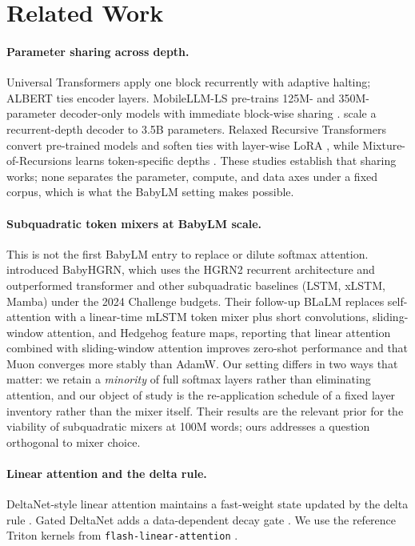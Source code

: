 \documentclass[11pt]{article}
\begin{document}
\section{Related Work}

\paragraph{Parameter sharing across depth.} Universal Transformers \citep{dehghani2019universal} apply one block recurrently with adaptive halting; ALBERT \citep{lan2020albert} ties encoder layers. MobileLLM-LS pre-trains 125M- and 350M-parameter decoder-only models with immediate block-wise sharing \citep{liu2024mobilellm}. \citet{geiping2025recurrent} scale a recurrent-depth decoder to 3.5B parameters. Relaxed Recursive Transformers convert pre-trained models and soften ties with layer-wise LoRA \citep{bae2024relaxed}, while Mixture-of-Recursions learns token-specific depths \citep{bae2025mor}. These studies establish that sharing works; none separates the parameter, compute, and data axes under a fixed corpus, which is what the BabyLM setting makes possible.

\paragraph{Subquadratic token mixers at BabyLM scale.} This is not the first BabyLM entry to replace or dilute softmax attention. \citet{haller2024babyhgrn} introduced BabyHGRN, which uses the HGRN2 recurrent architecture and outperformed transformer and other subquadratic baselines (LSTM, xLSTM, Mamba) under the 2024 Challenge budgets. Their follow-up BLaLM \citep{haller2025blalm} replaces self-attention with a linear-time mLSTM token mixer plus short convolutions, sliding-window attention, and Hedgehog feature maps, reporting that linear attention combined with sliding-window attention improves zero-shot performance and that Muon converges more stably than AdamW. Our setting differs in two ways that matter: we retain a \emph{minority} of full softmax layers rather than eliminating attention, and our object of study is the re-application schedule of a fixed layer inventory rather than the mixer itself. Their results are the relevant prior for the viability of subquadratic mixers at 100M words; ours addresses a question orthogonal to mixer choice.

\paragraph{Linear attention and the delta rule.} DeltaNet-style linear attention maintains a fast-weight state updated by the delta rule \citep{yang2024deltanet}. Gated DeltaNet adds a data-dependent decay gate \citep{yang2025gateddeltanet}. We use the reference Triton kernels from \texttt{flash-linear-attention} \citep{yang2024fla}.
\end{document}
